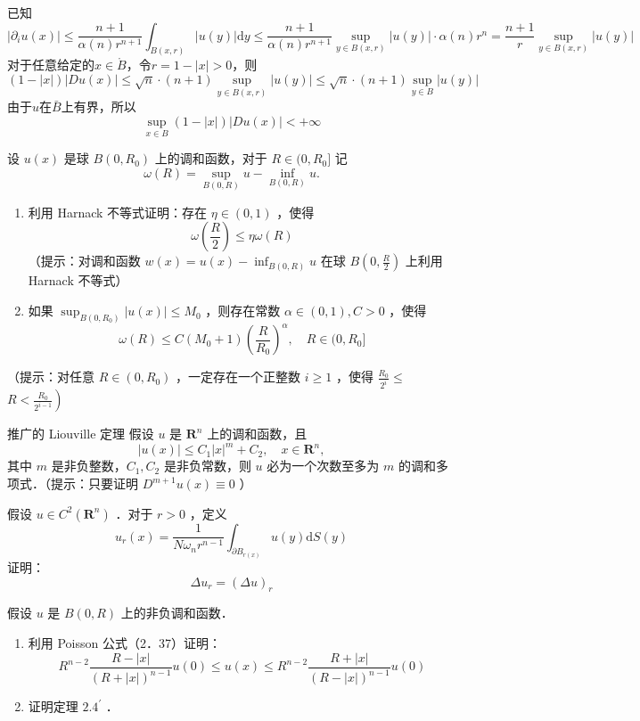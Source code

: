 \documentclass{mynote}
\begin{document}
已知
\[
    |\partial_i u(x)|\le \frac{n+1}{\alpha(n)r^{n+1}}\int_{B(x,r)}|u(y)|\mathrm{d}y\le \frac{n+1}{\alpha(n)r^{n+1}}\sup_{y\in B(x,r)}|u(y)|\cdot \alpha(n)r^{n}=\frac{n+1}{r}\sup_{y\in B(x,r)}|u(y)|
\]
对于任意给定的$x\in \mathring{B}$，令$r=1-|x|>0$，则
\[
    (1-|x|)|Du(x)|\le \sqrt{n}\cdot (n+1)\sup_{y\in B(x,r)}|u(y)|\le \sqrt{n}\cdot (n+1)\sup_{y\in B}|u(y)|
\]
由于$u$在$\bar{B}$上有界，所以
\[
    \sup_{x\in B}(1-|x|)|Du(x)|<+\infty
\]
\begin{exercise}
    设 $u(x)$ 是球 $B\left(0, R_0\right)$ 上的调和函数，对于 $R \in (0, R_0]$ 记
$$
\omega(R)=\sup _{B(0, R)} u-\inf _{B(0, R)} u .
$$
\begin{enumerate}
    \item 利用 Harnack 不等式证明：存在 $\eta \in(0,1)$ ，使得
$$
\omega\left(\frac{R}{2}\right) \leq \eta \omega(R)
$$
（提示：对调和函数 $w(x)=u(x)-\inf _{B(0, R)} u$ 在球 $B\left(0, \frac{R}{2}\right)$ 上利用 Harnack 不等式）
\item 如果 $\sup _{B\left(0, R_0\right)}|u(x)| \leq M_0$ ，则存在常数 $\alpha \in(0,1), C>0$ ，使得
$$
\omega(R) \leq C\left(M_0+1\right)\left(\frac{R}{R_0}\right)^\alpha, \quad R \in(0, R_0]
$$
\end{enumerate}
（提示：对任意 $R \in\left(0, R_0\right)$ ，一定存在一个正整数 $i \geq 1$ ，使得 $\frac{R_0}{2^i} \leq$ $\left.R<\frac{R_0}{2^{i-1}}\right)$

\end{exercise}


\begin{exercise}{推广的 Liouville 定理}
    假设 $u$ 是 $\mathbf{R}^n$ 上的调和函数，且
$$
|u(x)| \leq C_1|x|^m+C_2, \quad x \in \mathbf{R}^n,
$$
其中 $m$ 是非负整数，$C_1, C_2$ 是非负常数，则 $u$ 必为一个次数至多为 $m$ 的调和多项式．（提示：只要证明 $D^{m+1} u(x) \equiv 0$ ）
\end{exercise}

\begin{exercise}
    假设 $u \in C^2\left(\mathbf{R}^n\right)$ ．对于 $r>0$ ，定义   
$$
u_r(x)=\frac{1}{N \omega_n r^{n-1}} \int_{\partial B_{r(x)}} u(y) \mathrm{d} S(y)
$$
证明：
$$
\Delta u_r=(\Delta u)_r
$$
\end{exercise}

\begin{exercise}
    假设 $u$ 是 $B(0, R)$ 上的非负调和函数．
    \begin{enumerate}
        \item 利用 Poisson 公式（2．37）证明：
$$
R^{n-2} \frac{R-|x|}{(R+|x|)^{n-1}} u(0) \leq u(x) \leq R^{n-2} \frac{R+|x|}{(R-|x|)^{n-1}} u(0)
$$
        \item 证明定理 $2.4^{\prime}$ ．
    \end{enumerate}
\end{exercise}
\end{document}
